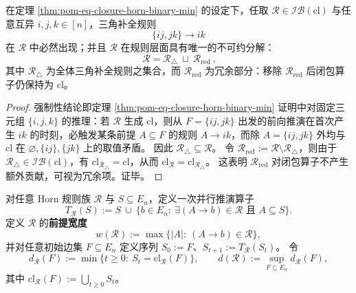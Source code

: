 \begin{corollary}[强制规则与不可约分解]\label{cor:pom-eq-closure-unavoidable-triangles}
在定理 \ref{thm:pom-eq-closure-horn-binary-min} 的设定下，任取 \(\mathcal{R}\in\mathcal{IB}(\mathrm{cl})\) 与任意互异 \(i,j,k\in[n]\)，三角补全规则
\[
\{ij,jk\}\to ik
\]
在 \(\mathcal{R}\) 中必然出现；并且 \(\mathcal{R}\) 在规则层面具有唯一的不可约分解：
\[
\boxed{\ \mathcal{R}=\mathcal{R}_{\triangle}\ \sqcup\ \mathcal{R}_{\mathrm{red}}\ },
\]
其中 \(\mathcal{R}_{\triangle}\) 为全体三角补全规则之集合，而 \(\mathcal{R}_{\mathrm{red}}\) 为冗余部分：移除 \(\mathcal{R}_{\mathrm{red}}\) 后闭包算子仍保持为 \(\mathrm{cl}\)。
\end{corollary}
\begin{proof}
强制性结论即定理 \ref{thm:pom-eq-closure-horn-binary-min} 证明中对固定三元组 \(\{i,j,k\}\) 的推理：若 \(\mathcal{R}\) 生成 \(\mathrm{cl}\)，则从 \(F=\{ij,jk\}\) 出发的前向推演在首次产生 \(ik\) 的时刻，必触发某条前提 \(A\subseteq F\) 的规则 \(A\to ik\)，而除 \(A=\{ij,jk\}\) 外均与 \(\mathrm{cl}\) 在 \(\varnothing,\{ij\},\{jk\}\) 上的取值矛盾。
因此 \(\mathcal{R}_{\triangle}\subseteq \mathcal{R}\)。
令 \(\mathcal{R}_{\mathrm{red}}:=\mathcal{R}\setminus \mathcal{R}_{\triangle}\)，则由于 \(\mathcal{R}_{\triangle}\in \mathcal{IB}(\mathrm{cl})\)，有 \(\mathrm{cl}_{\mathcal{R}_{\triangle}}=\mathrm{cl}\)，从而 \(\mathrm{cl}_{\mathcal{R}}=\mathrm{cl}_{\mathcal{R}_{\triangle}}\)。
这表明 \(\mathcal{R}_{\mathrm{red}}\) 对闭包算子不产生额外贡献，可视为冗余项。证毕。
\end{proof}

\begin{definition}\label{def:pom-horn-width-depth}
对任意 Horn 规则族 \(\mathcal{R}\) 与 \(S\subseteq E_n\)，定义一次并行推演算子
\[
T_{\mathcal{R}}(S):=S\ \cup\ \{b\in E_n:\ \exists(A\to b)\in\mathcal{R}\text{ 且 }A\subseteq S\}.
\]
定义 \(\mathcal{R}\) 的\textbf{前提宽度}
\[
w(\mathcal{R}):=\max\{|A|:\ (A\to b)\in\mathcal{R}\},
\]
并对任意初始边集 \(F\subseteq E_n\) 定义序列 \(S_0:=F\)、\(S_{t+1}:=T_{\mathcal{R}}(S_t)\)。
令
\[
d_{\mathcal{R}}(F):=\min\{t\ge 0:\ S_t=\mathrm{cl}_{\mathcal{R}}(F)\},
\qquad
d(\mathcal{R}):=\sup_{F\subseteq E_n} d_{\mathcal{R}}(F),
\]
其中 \(\mathrm{cl}_{\mathcal{R}}(F):=\bigcup_{t\ge 0} S_t\)。
\end{definition}

